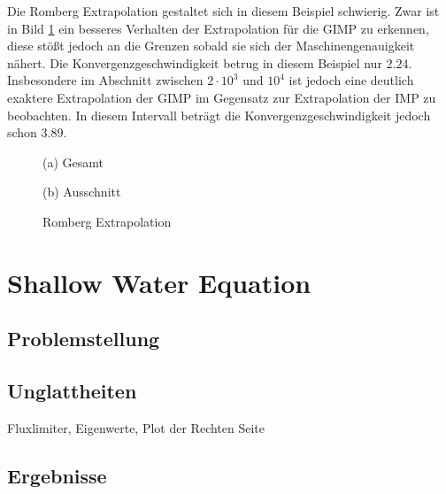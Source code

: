 Die Romberg Extrapolation gestaltet sich in diesem Beispiel schwierig. Zwar ist in Bild \ref{fig:lcRomberg} ein besseres Verhalten der Extrapolation für die GIMP zu erkennen, diese stößt jedoch an die Grenzen sobald sie sich der Maschinengenauigkeit nähert.  Die Konvergenzgeschwindigkeit betrug in diesem Beispiel nur $2.24$. Insbesondere im Abschnitt zwischen $2\cdot 10^{3}$ und $10^4$ ist jedoch eine deutlich exaktere Extrapolation der GIMP im Gegensatz zur Extrapolation der IMP zu beobachten. In diesem Intervall beträgt die Konvergenzgeschwindigkeit jedoch schon $3.89$. 
\begin{figure}[H]
\footnotesize 
\centering
\begin{minipage}[b]{0.49\linewidth}

\caption*{(a) Gesamt}
\end{minipage}
\begin{minipage}[b]{0.49\linewidth}

\caption*{(b) Ausschnitt}
\end{minipage}
\caption{Romberg Extrapolation}
\label{fig:lcRomberg}
\end{figure}
\section{Shallow Water Equation}
\subsection{Problemstellung}
\subsection{Unglattheiten}
Fluxlimiter, Eigenwerte, Plot der Rechten Seite
\subsection{Ergebnisse}


